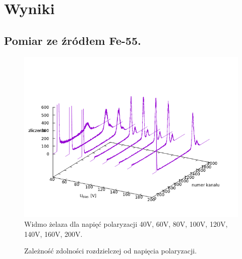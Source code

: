 \documentclass[11pt,a4paper]{article}
\begin{document}
\section{Wyniki}
\subsection{Pomiar ze źródłem Fe-55.}

\begin{figure}[H]
\centering
\includegraphics[width=.9\linewidth]{fe.png}
\caption{Widmo żelaza dla napięć polaryzacji 40V, 60V, 80V, 100V, 120V, 140V, 160V, 200V.}
\label{fig1}
\end{figure}


\begin{figure}[H]
\centering
\resizebox{.8\linewidth}{!}{}
\caption{Zależność zdolności rozdzielczej od napięcia polaryzacji.}
\label{fig1}
\end{figure}
\end{document}

